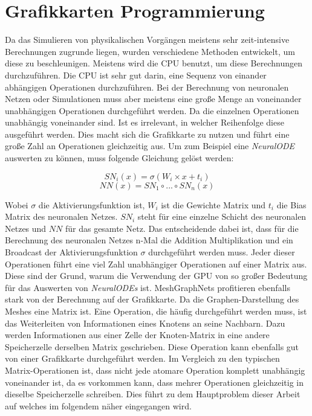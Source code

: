 
\section{Grafikkarten Programmierung} \label{sec:gpu}

Da das Simulieren von physikalischen Vorgängen 
meistens sehr zeit-intensive Berechnungen zugrunde liegen, 
wurden verschiedene Methoden entwickelt, 
um diese zu beschleunigen.
Meistens wird die CPU benutzt, um diese Berechnungen durchzuführen.
Die CPU ist sehr gut darin, eine Sequenz von einander abhängigen Operationen durchzuführen.
Bei der Berechnung von neuronalen Netzen oder Simulationen muss aber meistens eine große Menge 
an voneinander unabhängigen Operationen durchgeführt werden.
Da die einzelnen Operationen unabhängig voneinander sind.
Ist es irrelevant, in welcher Reihenfolge diese ausgeführt werden.
Dies macht sich die Grafikkarte zu nutzen und führt eine große Zahl an Operationen gleichzeitig aus.
Um zum Beispiel eine \textit{NeuralODE} auswerten zu können, muss folgende Gleichung gelöst werden:

$$
SN_i(x) = \sigma ( W_i \times x + t_i )
$$
$$
NN(x) = SN_1 \circ ... \circ SN_n (x)
$$

Wobei $\sigma$ die Aktivierungsfunktion ist, $W_i$ ist die Gewichte Matrix und $t_i$ die Bias Matrix des neuronalen Netzes.
$SN_i$ steht für eine einzelne Schicht des neuronalen Netzes und $NN$ für das gesamte Netz.
Das entscheidende dabei ist, dass für die Berechnung des neuronalen Netzes n-Mal die Addition Multiplikation und ein Broadcast der Aktivierungsfunktion
$\sigma$ durchgeführt werden muss.
Jeder dieser Operationen führt eine viel Zahl unabhängiger Operationen auf einer Matrix aus.
Diese sind der Grund, warum die Verwendung der GPU von so großer Bedeutung für das Auswerten von \textit{NeuralODEs} ist.
MeshGraphNets profitieren ebenfalls stark von der Berechnung auf der Grafikkarte.
Da die Graphen-Darstellung des Meshes eine Matrix ist.
Eine Operation, die häufig durchgeführt werden muss, ist das Weiterleiten von Informationen eines Knotens an seine Nachbarn.
Dazu werden Informationen aus einer Zelle der Knoten-Matrix in eine andere Speicherzelle derselben Matrix geschrieben.
Diese Operation kann ebenfalls gut von einer Grafikkarte durchgeführt werden.
Im Vergleich zu den typischen Matrix-Operationen ist, dass nicht jede atomare Operation komplett unabhängig voneinander ist,
da es vorkommen kann, dass mehrer Operationen gleichzeitig in dieselbe Speicherzelle schreiben.
Dies führt zu dem Hauptproblem dieser Arbeit auf welches im folgendem näher eingegangen wird.

% 
